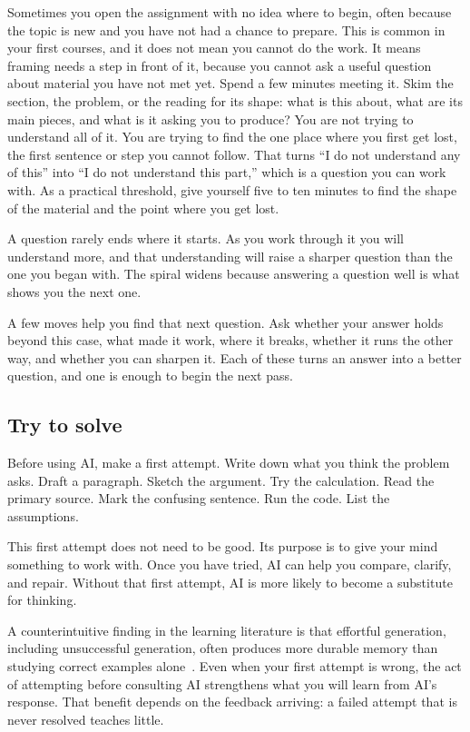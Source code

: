 \documentclass{SIAMbook2023}
\begin{document}
Sometimes you open the assignment with no idea where to begin, often because the topic is new and you have not had a chance to prepare. This is common in your first courses, and it does not mean you cannot do the work. It means framing needs a step in front of it, because you cannot ask a useful question about material you have not met yet. Spend a few minutes meeting it. Skim the section, the problem, or the reading for its shape: what is this about, what are its main pieces, and what is it asking you to produce? You are not trying to understand all of it. You are trying to find the one place where you first get lost, the first sentence or step you cannot follow. That turns ``I do not understand any of this'' into ``I do not understand this part,'' which is a question you can work with. As a practical threshold, give yourself five to ten minutes to find the shape of the material and the point where you get lost.

A question rarely ends where it starts. As you work through it you will understand more, and that understanding will raise a sharper question than the one you began with. The spiral widens because answering a question well is what shows you the next one.

A few moves help you find that next question. Ask whether your answer holds beyond this case, what made it work, where it breaks, whether it runs the other way, and whether you can sharpen it. Each of these turns an answer into a better question, and one is enough to begin the next pass.

\subsection{Try to solve}
\label{subsec:try-first}%

Before using AI, make a first attempt. Write down what you think the problem asks. Draft a paragraph. Sketch the argument. Try the calculation. Read the primary source. Mark the confusing sentence. Run the code. List the assumptions.

This first attempt does not need to be good. Its purpose is to give your mind something to work with. Once you have tried, AI can help you compare, clarify, and repair. Without that first attempt, AI is more likely to become a substitute for thinking.

A counterintuitive finding in the learning literature is that effortful generation, including unsuccessful generation, often produces more durable memory than studying correct examples alone~\citep{bjork2011making,kornell2009unsuccessful}. Even when your first attempt is wrong, the act of attempting before consulting AI strengthens what you will learn from AI's response. That benefit depends on the feedback arriving: a failed attempt that is never resolved teaches little.
\end{document}
